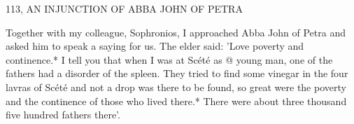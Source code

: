 113, AN INJUNCTION OF ABBA JOHN OF PETRA

Together with my colleague, Sophronios, I approached Abba John
of Petra and asked him to speak a saying for us.
The elder said:
'Love poverty and continence.* I tell you that when I was at Scété
as @ young man, one of the fathers had a disorder of the spleen.
They tried to find some vinegar in the four lavras of Scété and not
a drop was there to be found, so great were the poverty and the
continence of those who lived there.* There were about three
thousand five hundred fathers there'.

